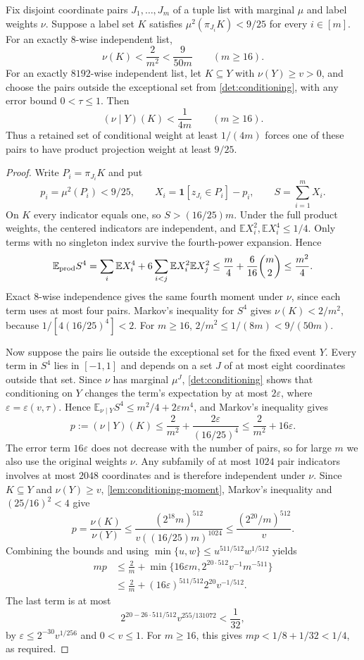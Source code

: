 \documentclass[11pt,letterpaper]{article} \usepackage[utf8]{inputenc}
\theoremstyle{plain} \newtheorem{theorem}{Theorem}[section]
\theoremstyle{definition} \newaliascnt{definition}{theorem}
\newcommand{\ind}{\mathbf{1}}
\begin{document}
\begin{lemma}\label{lem:pair-projections}
Fix disjoint coordinate pairs $J_1,\ldots,J_m$ of a tuple list with marginal
$\mu$ and label weights $\nu$. Suppose a label set $K$ satisfies
$\mu^2(\pi_{J_i}K)<9/25$ for every $i\in[m]$.
For an exactly $8$-wise independent list,
\[
\nu(K)<\frac2{m^2}<\frac9{50m}\qquad(m\ge16).
\]
For an exactly $8192$-wise independent list, let $K\subseteq Y$ with
$\nu(Y)\ge v>0$, and choose the pairs outside the exceptional set from
\cref{det:conditioning}, with any error bound $0<\tau\le1$. Then
\[
(\nu\mid Y)(K)<\frac1{4m}\qquad(m\ge16).
\]
Thus a retained set of conditional weight at least $1/(4m)$ forces one of
these pairs to have product projection weight at least $9/25$.
\end{lemma}
\begin{proof}
Write $P_i=\pi_{J_i}K$ and put
\[
p_i=\mu^2(P_i)<9/25,\qquad
X_i=\ind[z_{J_i}\in P_i]-p_i,\qquad S=\sum_{i=1}^mX_i.
\]
On $K$ every indicator equals one, so $S>(16/25)m$. Under the full product
weights, the centered indicators are independent, and
$\mathbb EX_i^2,\mathbb EX_i^4\le1/4$. Only terms with no
singleton index survive the fourth-power expansion. Hence
\[
\mathbb E_{\rm prod}S^4
=\sum_i\mathbb EX_i^4+6\sum_{i<j}\mathbb EX_i^2\mathbb EX_j^2
\le\frac m4+\frac6{16}\binom m2\le\frac{m^2}4.
\]
Exact $8$-wise independence gives the same fourth moment under $\nu$,
since each term uses at most four pairs. Markov's inequality for $S^4$ gives
$\nu(K)<2/m^2$, because $1/[4(16/25)^4]<2$.
For $m\ge16$, $2/m^2\le1/(8m)<9/(50m)$.

Now suppose the pairs lie outside the exceptional set for the fixed event $Y$.
Every term in $S^4$
lies in $[-1,1]$ and depends on a set $J$ of at most eight coordinates outside that set.
Since $\nu$ has marginal $\mu^J$, \cref{det:conditioning} shows that conditioning on $Y$ changes
the term's expectation by at most $2\varepsilon$, where
$\varepsilon=\varepsilon(v,\tau)$. Hence $\mathbb E_{\nu\mid Y}S^4\le m^2/4+2\varepsilon m^4$, and Markov's inequality gives
\[
p:=(\nu\mid Y)(K)
\le\frac2{m^2}+\frac{2\varepsilon}{(16/25)^4}
\le\frac2{m^2}+16\varepsilon.
\]
The error term $16\varepsilon$ does not decrease with the number of pairs,
so for large $m$ we also use the original weights $\nu$. Any subfamily of at most $1024$ pair indicators involves at most $2048$
coordinates and is therefore independent under $\nu$. Since $K\subseteq Y$ and
$\nu(Y)\ge v$, \cref{lem:conditioning-moment}, Markov's inequality and
$(25/16)^2<4$ give
\[
p=\frac{\nu(K)}{\nu(Y)}
\le\frac{(2^{18}m)^{512}}{v((16/25)m)^{1024}}
\le\frac{(2^{20}/m)^{512}}v.
\]
Combining the bounds and using
$\min\{u,w\}\le u^{511/512}w^{1/512}$ yields
\[
\begin{aligned}
mp&\le\frac2m+
\min\{16\varepsilon m,2^{20\cdot512}v^{-1}m^{-511}\}
\\
&\le\frac2m+(16\varepsilon)^{511/512}2^{20}v^{-1/512}.
\end{aligned}
\]
The last term is at most
\[
2^{20-26\cdot511/512}v^{255/131072}<\frac1{32},
\]
by $\varepsilon\le2^{-30}v^{1/256}$ and $0<v\le1$. For $m\ge16$, this gives
$mp<1/8+1/32<1/4$, as required.
\end{proof}
\end{document}
